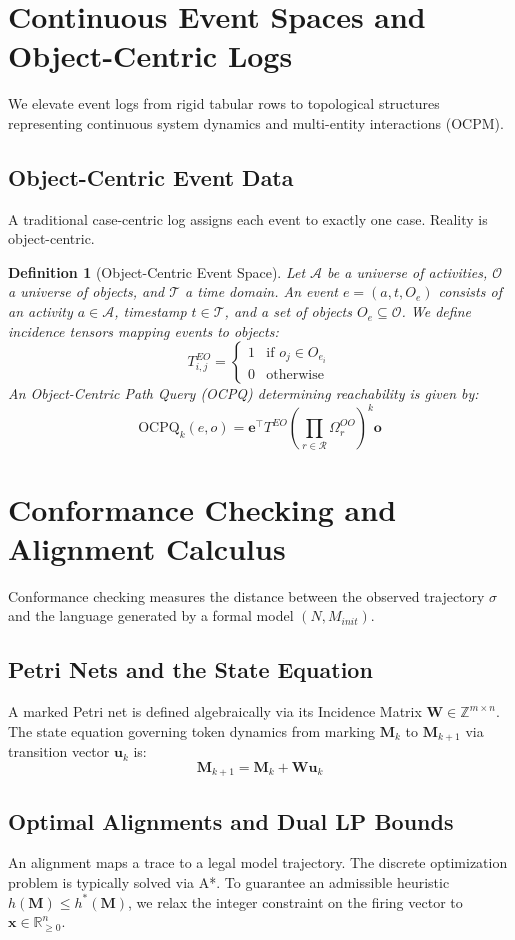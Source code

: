 \documentclass[11pt,a4paper,twocolumn]{article}
\newtheorem{definition}{Definition}
\begin{document}
\section{Continuous Event Spaces and Object-Centric Logs}
We elevate event logs from rigid tabular rows to topological structures representing continuous system dynamics and multi-entity interactions (OCPM).

\subsection{Object-Centric Event Data}
A traditional case-centric log assigns each event to exactly one case. Reality is object-centric.
\begin{definition}[Object-Centric Event Space]
Let $\mathcal{A}$ be a universe of activities, $\mathcal{O}$ a universe of objects, and $\mathcal{T}$ a time domain. An event $e = (a, t, O_e)$ consists of an activity $a \in \mathcal{A}$, timestamp $t \in \mathcal{T}$, and a set of objects $O_e \subseteq \mathcal{O}$.
We define incidence tensors mapping events to objects:
\[
T^{EO}_{i,j} = \begin{cases} 1 & \text{if } o_j \in O_{e_i} \\ 0 & \text{otherwise} \end{cases}
\]
An Object-Centric Path Query (OCPQ) determining reachability is given by:
\[
\mathrm{OCPQ}_{k}(e,o) = \mathbf{e}^{\top} T^{EO} \left( \prod_{r \in \mathcal{R}} \Omega^{OO}_{r} \right)^k \mathbf{o}
\]
\end{definition}

\section{Conformance Checking and Alignment Calculus}
Conformance checking measures the distance between the observed trajectory $\sigma$ and the language generated by a formal model $(N, M_{init})$.

\subsection{Petri Nets and the State Equation}
A marked Petri net is defined algebraically via its Incidence Matrix $\mathbf{W} \in \mathbb{Z}^{m \times n}$. The state equation governing token dynamics from marking $\mathbf{M}_k$ to $\mathbf{M}_{k+1}$ via transition vector $\mathbf{u}_k$ is:
\[ \mathbf{M}_{k+1} = \mathbf{M}_k + \mathbf{W} \mathbf{u}_k \]

\subsection{Optimal Alignments and Dual LP Bounds}
An alignment maps a trace to a legal model trajectory. The discrete optimization problem is typically solved via A*. To guarantee an admissible heuristic $h(\mathbf{M}) \le h^*(\mathbf{M})$, we relax the integer constraint on the firing vector to $\mathbf{x} \in \mathbb{R}_{\ge 0}^n$.
\end{document}
